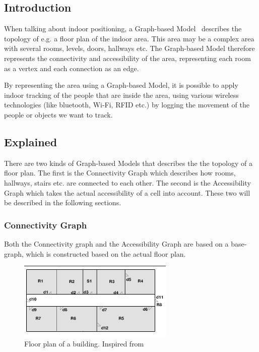 \subsection{Introduction}
When talking about indoor positioning, a Graph-based Model~\cite{Jensen:2009:GMB:1590953.1591000} describes the topology of e.g. a floor plan of the indoor area. 
This area may be a complex area with several rooms, levels, doors, hallways etc. 
The Graph-based Model therefore represents the connectivity and accessibility of the area, representing each room as a vertex and each connection as an edge. 

By representing the area using a Graph-based Model, it is possible to apply indoor tracking of the people that are inside the area, using various wireless technologies (like bluetooth, Wi-Fi, RFID etc.) by logging the movement of the people or objects we want to track.


\subsection{Explained}
There are two kinds of Graph-based Models that describes the the topology of a floor plan. 
The first is the Connectivity Graph which describes how rooms, hallways, stairs etc. are connected to each other. 
The second is the Accessibility Graph which takes the actual accessibility of a cell into account. 
These two will be described in the following sections. 


\subsubsection{ \quad Connectivity Graph}
Both the Connectivity graph and the Accessibility Graph are based on a base-graph, which is constructed based on the actual floor plan. 

\begin{figure}[H]%
\includegraphics[width=\columnwidth]{images/floorplan.png}%
\caption{Floor plan of a building. Inspired from~\cite{Jensen:2009:GMB:1590953.1591000}}%
\label{fig:floortplan}%
\end{figure}%

